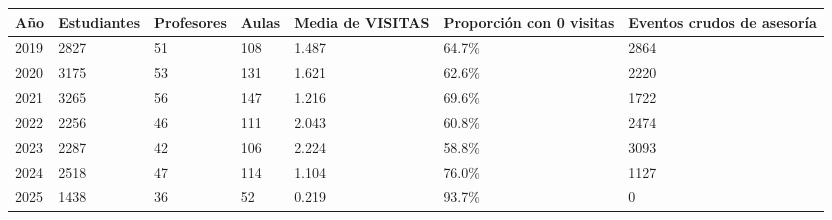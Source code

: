 \begin{tabular}{lllllll}
\toprule
Año & Estudiantes & Profesores & Aulas & Media de VISITAS & Proporción con 0 visitas & Eventos crudos de asesoría \\
\midrule
2019 & 2827 & 51 & 108 & 1.487 & 64.7\% & 2864 \\
2020 & 3175 & 53 & 131 & 1.621 & 62.6\% & 2220 \\
2021 & 3265 & 56 & 147 & 1.216 & 69.6\% & 1722 \\
2022 & 2256 & 46 & 111 & 2.043 & 60.8\% & 2474 \\
2023 & 2287 & 42 & 106 & 2.224 & 58.8\% & 3093 \\
2024 & 2518 & 47 & 114 & 1.104 & 76.0\% & 1127 \\
2025 & 1438 & 36 & 52 & 0.219 & 93.7\% & 0 \\
\bottomrule
\end{tabular}
